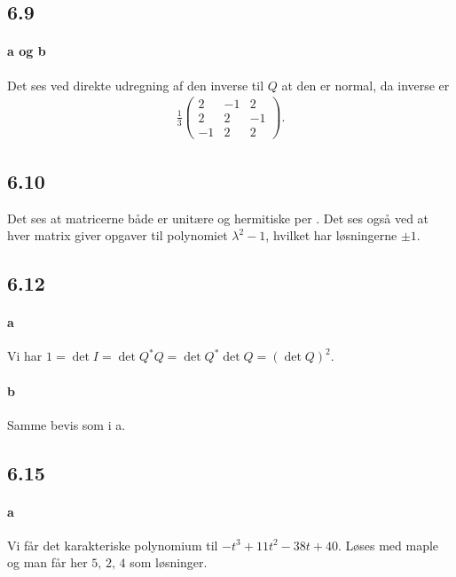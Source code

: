 		\subsection{6.9}

			\paragraph{a og b} Det ses ved direkte udregning af den inverse til $Q$ at den er normal, da inverse er
				\begin{align*}
					\frac{1}{3}\left(\begin{array}{rrrr} 2 & -1 & 2 \\ 2 & 2 &-1 \\ -1 & 2 & 2 \end{array}\right).
				\end{align*} 

		\subsection{6.10}

			Det ses at matricerne både er unitære og hermitiske per \cite[Definition 6.3.14]{hesselholt2017}. Det ses også ved at hver matrix giver opgaver til polynomiet $\lambda^2-1$, hvilket har løsningerne $\pm 1$.

		\subsection{6.12}

			\paragraph{a} Vi har $1=\det I = \det Q^{*} Q = \det Q^{*} \det Q=(\det Q)^2$.

			\paragraph{b} Samme bevis som i a.

		\subsection{6.15}

			\paragraph{a} Vi får det karakteriske polynomium til $-t^3 + 11t^2 - 38t + 40$. Løses med maple og man får her $5,\,2,\,4$ som løsninger.

